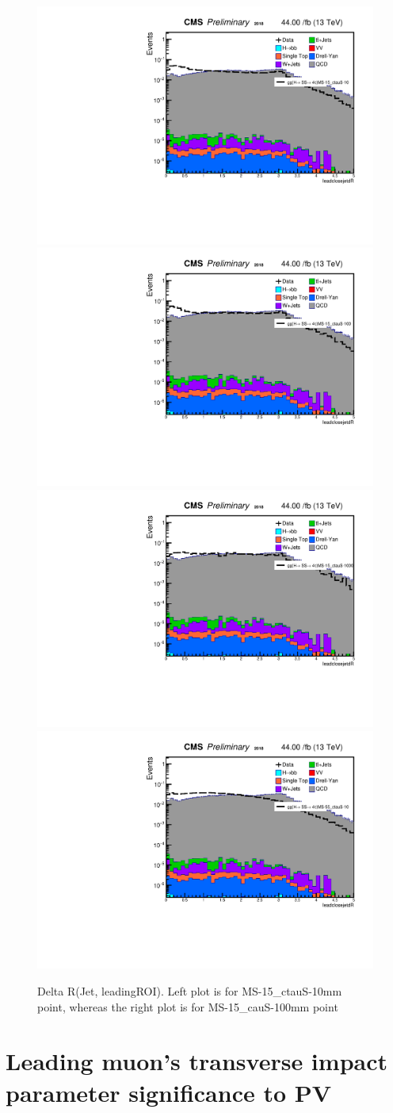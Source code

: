  \begin{figure}[h!]
   \caption{Delta R(Jet, leadingROI). Left plot is for MS-15\_ctauS-10mm point, whereas the right plot is for MS-15\_cauS-100mm point}
   \label{fig:JetDeltaRleadSize}
   \centering
   \includegraphics[width=0.47\linewidth]{figs/log_Oct6ANVars_MS-15_ctauS-10_leadcloseJetdR.pdf}
   \includegraphics[width=0.47\linewidth]{figs/log_Oct6ANVars_MS-15_ctauS-100_leadcloseJetdR.pdf}
   \includegraphics[width=0.47\linewidth]{figs/log_Oct6ANVars_MS-15_ctauS-1000_leadcloseJetdR.pdf}
   \includegraphics[width=0.47\linewidth]{figs/log_Oct6ANVars_MS-55_ctauS-10_leadcloseJetdR.pdf}
 \end{figure}

\section{Leading muon's transverse impact parameter significance to PV}\label{ref:muIP}

